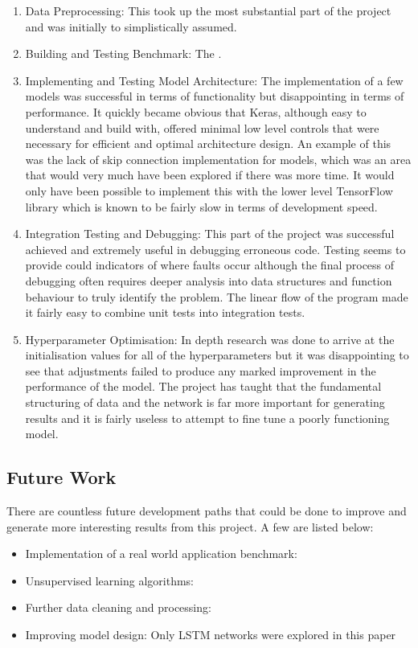\documentclass[10pt,onecolumn,letterpaper]{article}
\begin{document}
\begin{enumerate}
	\item Data Preprocessing: This took up the most substantial part of the project and was initially to simplistically assumed.
	 \item Building and Testing Benchmark: The . 
	\item Implementing and Testing Model Architecture: The implementation of a few models was successful in terms of functionality but disappointing in terms of performance. It quickly became obvious that Keras, although easy to understand and build with, offered minimal low level controls that were necessary for efficient and optimal architecture design. An example of this was the lack of skip connection implementation for models, which was an area that would very much have been explored if there was more time. It would only have been possible to implement this with the lower level TensorFlow library which is known to be fairly slow in terms of development speed.
	\item Integration Testing and Debugging: This part of the project was successful achieved and extremely useful in debugging erroneous code. Testing seems to provide could indicators of where faults occur although the final process of debugging often requires deeper analysis into data structures and function behaviour to truly identify the problem. The linear flow of the program made it fairly easy to combine unit tests into integration tests.
	\item Hyperparameter Optimisation: In depth research was done to arrive at the initialisation values for all of the hyperparameters but it was disappointing to see that adjustments failed to produce any marked improvement in the performance of the model. The project has taught that the fundamental structuring of data and the network is far more important for generating results and it is fairly useless to attempt to fine tune a poorly functioning model.  
\end{enumerate}

\subsection{Future Work} 

There are countless future development paths that could be done to improve and generate more interesting results from this project. A few are listed below:  

\begin{itemize}
	\item Implementation of a real world application benchmark: 
	\item Unsupervised learning algorithms:
	\item Further data cleaning and processing:
	\item Improving model design: Only LSTM networks were explored in this paper
\end{itemize}
\end{document}
